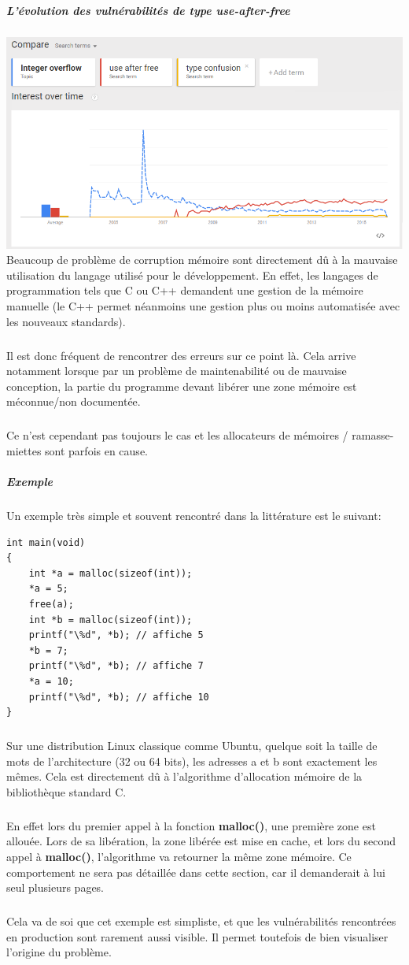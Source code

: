 \subparagraph{L'évolution des vulnérabilités de type use-after-free}
\includegraphics[scale=0.5]{histogramme-uaf.png}\newline
Beaucoup de problème de corruption mémoire sont directement dû à la mauvaise utilisation
du langage utilisé pour le développement. En effet, les langages de programmation tels que C
ou C++ demandent une gestion de la mémoire manuelle (le C++ permet néanmoins une gestion plus ou moins automatisée
avec les nouveaux standards).
\subparagraph{}
Il est donc fréquent de rencontrer des erreurs sur ce point là. Cela arrive
notamment lorsque par un problème de maintenabilité ou de mauvaise conception, la partie du programme devant
libérer une zone mémoire est méconnue/non documentée.\subparagraph{}
Ce n'est cependant pas toujours le cas et les allocateurs de mémoires / ramasse-miettes sont parfois en cause.

\subparagraph{Exemple}
Un exemple très simple et souvent rencontré dans la littérature est le suivant:
\begin {lstlisting}[frame=single]
int main(void)
{
    int *a = malloc(sizeof(int));
    *a = 5;
    free(a);
    int *b = malloc(sizeof(int));
    printf("\%d", *b); // affiche 5
    *b = 7;
    printf("\%d", *b); // affiche 7
    *a = 10;
    printf("\%d", *b); // affiche 10
}
\end{lstlisting}
\subparagraph{}
Sur une distribution Linux classique comme Ubuntu, quelque soit la taille de mots
de l'architecture (32 ou 64 bits), les adresses a et b sont exactement les mêmes.
Cela est directement dû à l'algorithme d'allocation mémoire de la bibliothèque standard
C.\subparagraph{}
En effet lors du premier appel à la fonction \textbf{malloc()}, une première zone est allouée.
Lors de sa libération, la zone libérée est mise en cache, et lors du second appel à \textbf{malloc()},
l'algorithme va retourner la même zone mémoire. Ce comportement ne sera pas détaillée dans cette section, car
il demanderait à lui seul plusieurs pages.\subparagraph{}
Cela va de soi que cet exemple est simpliste, et que les vulnérabilités rencontrées en production sont
rarement aussi visible. Il permet toutefois de bien visualiser l'origine du problème.


